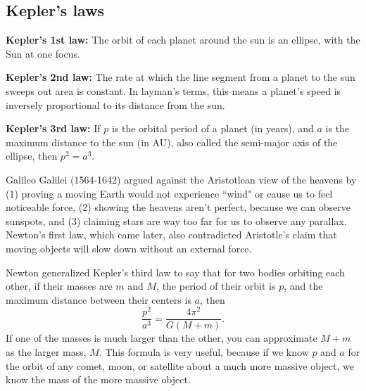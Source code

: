 \documentclass[class=article, crop=false]{standalone}
\begin{document}
\subsection{Kepler's laws}
\par
\textbf{Kepler's 1st law:} The orbit of each planet around the sun is an ellipse, with the Sun at one focus.
\par
\textbf{Kepler's 2nd law:} The rate at which the line segment from a planet to the sun sweeps out area is constant. In layman's terms, this means a planet's speed is inversely proportional to its distance from the sun.
\par
\textbf{Kepler's 3rd law:} If $p$ is the orbital period of a planet (in years), and $a$ is the maximum distance to the sun (in AU), also called the semi-major axis of the ellipse, then $p^2=a^3$.
\par
Galileo Galilei (1564-1642) argued against the Aristotlean view of the heavens by (1) proving a moving Earth would not experience ``wind" or cause us to feel noticeable force, (2) showing the heavens aren't perfect, because we can observe sunspots, and (3) claiming stars are way too far for us to observe any parallax. Newton's first law, which came later, also contradicted Aristotle's claim that moving objects will slow down without an external force.
\par
Newton generalized Kepler's third law to say that for two bodies orbiting each other, if their masses are $m$ and $M$, the period of their orbit is $p$, and the maximum distance between their centers is $a$, then
\[ \frac{p^2}{a^3} = \frac{4\pi^2}{G (M+m)}. \]
If one of the masses is much larger than the other, you can approximate $M+m$ as the larger mass, $M$. This formula is very useful, because if we know $p$ and $a$ for the orbit of any comet, moon, or satellite about a much more massive object, we know the mass of the more massive object.
\end{document}
